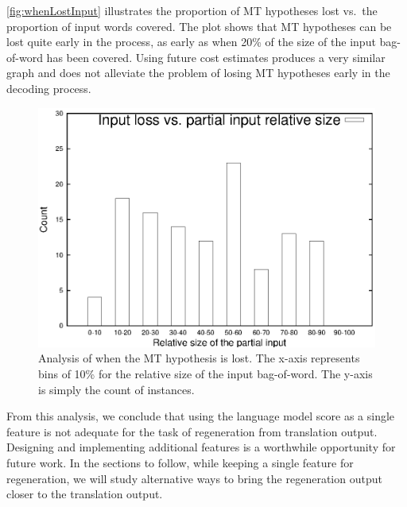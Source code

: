 \autoref{fig:whenLostInput} illustrates the proportion of MT hypotheses
lost vs.\ the proportion of input words covered.
The plot shows that
MT hypotheses can be lost quite early in the process, as early as
when 20\% of the size of the input bag-of-word has been covered.
Using future cost estimates produces a very similar graph and does not
alleviate the problem of losing MT hypotheses early in the decoding process.
%
\begin{figure}
\begin{center}
  \includegraphics[scale = 0.8]{figures/whenLostInput/Tune.text.nw.v3x08.1stpass.10best.exp.allrules.mmap.nbest1000.1.whenlostinput.eps}
\caption{Analysis of when the MT hypothesis is lost. The x-axis represents bins of 10\% for the relative size of the input bag-of-word.
The y-axis is simply the count of instances.}
\label{fig:whenLostInput}
\end{center}
\end{figure}
%

From this analysis, we conclude that using the language model score as
a single feature is not adequate for the task of regeneration from
translation output. Designing and implementing additional features is
a worthwhile opportunity for future work. In the sections to follow, while
keeping a single feature for regeneration, we will study
alternative ways to bring the regeneration output closer to the translation output.

